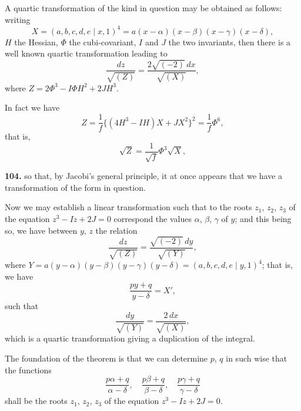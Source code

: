\documentclass[11pt,a4paper]{article}
\theoremstyle{plain}
\begin{document}
A quartic transformation of the kind in question may be obtained as follows: writing
\[
X = (a, b, c, d, e\!\!\mid x, 1)^4 = a(x-\alpha)(x-\beta)(x-\gamma)(x-\delta),
\]
$H$ the Hessian, $\Phi$ the cubi-covariant, $I$ and $J$ the two invariants, then there is a well known quartic transformation leading to
\[
\frac{dz}{\sqrt{(Z)}} = \frac{2\sqrt{(-2)}\,dx}{\sqrt{(X)}},
\]
where $Z = 2\Phi^3 - I\Phi H^2 + 2JH^3$.

In fact we have
\[
Z = \frac{1}{f}\{(4H^3 - IH)X + JX^2\}^2 = \frac{1}{f}\Phi^6,
\]
that is,
\[
\sqrt{Z} = \frac{1}{\sqrt{f}}\Phi^3\sqrt{X},
\]

\noindent\textbf{104.} so that, by Jacobi's general principle, it at once appears that we have a transformation of the form in question.

Now we may establish a linear transformation such that to the roots $z_1$, $z_2$, $z_3$ of the equation $z^3 - Iz + 2J = 0$ correspond the values $\alpha$, $\beta$, $\gamma$ of $y$; and this being so, we have between $y$, $z$ the relation
\[
\frac{dz}{\sqrt{(Z)}} = \frac{\sqrt{(-2)}\,dy}{\sqrt{(Y)}},
\]
where $Y = a(y-\alpha)(y-\beta)(y-\gamma)(y-\delta) = (a, b, c, d, e\!\!\mid y, 1)^4$; that is, we have
\[
\frac{py + q}{y - \delta} = X',
\]
such that
\[
\frac{dy}{\sqrt{(Y)}} = \frac{2\,dx}{\sqrt{(X)}},
\]
which is a quartic transformation giving a duplication of the integral.

The foundation of the theorem is that we can determine $p$, $q$ in such wise that the functions
\[
\frac{p\alpha + q}{\alpha - \delta}, \quad \frac{p\beta + q}{\beta - \delta}, \quad \frac{p\gamma + q}{\gamma - \delta}
\]
shall be the roots $z_1$, $z_2$, $z_3$ of the equation $z^3 - Iz + 2J = 0$.
\end{document}
